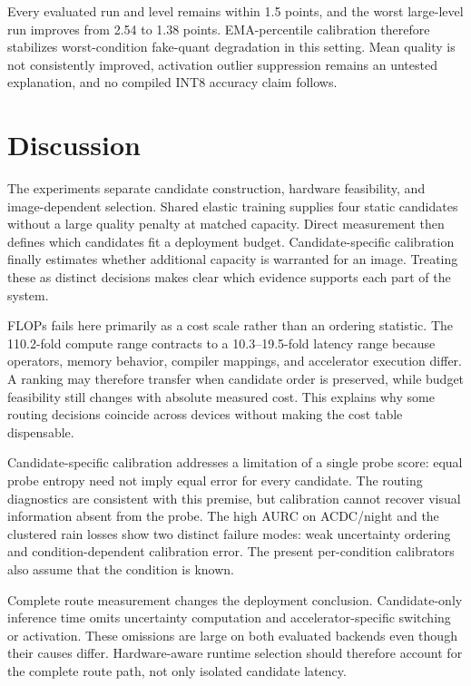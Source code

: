 \documentclass[a4paper,review,12pt]{elsarticle}
\begin{document}
Every evaluated run and level remains within 1.5 points, and the worst large-level run improves from 2.54 to 1.38 points. EMA-percentile calibration therefore stabilizes worst-condition fake-quant degradation in this setting. Mean quality is not consistently improved, activation outlier suppression remains an untested explanation, and no compiled INT8 accuracy claim follows.

\section{Discussion}
\label{sec:discussion}

The experiments separate candidate construction, hardware feasibility, and image-dependent selection. Shared elastic training supplies four static candidates without a large quality penalty at matched capacity. Direct measurement then defines which candidates fit a deployment budget. Candidate-specific calibration finally estimates whether additional capacity is warranted for an image. Treating these as distinct decisions makes clear which evidence supports each part of the system.

FLOPs fails here primarily as a cost scale rather than an ordering statistic. The 110.2-fold compute range contracts to a 10.3--19.5-fold latency range because operators, memory behavior, compiler mappings, and accelerator execution differ. A ranking may therefore transfer when candidate order is preserved, while budget feasibility still changes with absolute measured cost. This explains why some routing decisions coincide across devices without making the cost table dispensable.

Candidate-specific calibration addresses a limitation of a single probe score: equal probe entropy need not imply equal error for every candidate. The routing diagnostics are consistent with this premise, but calibration cannot recover visual information absent from the probe. The high AURC on ACDC/night and the clustered rain losses show two distinct failure modes: weak uncertainty ordering and condition-dependent calibration error. The present per-condition calibrators also assume that the condition is known.

Complete route measurement changes the deployment conclusion. Candidate-only inference time omits uncertainty computation and accelerator-specific switching or activation. These omissions are large on both evaluated backends even though their causes differ. Hardware-aware runtime selection should therefore account for the complete route path, not only isolated candidate latency.
\end{document}
